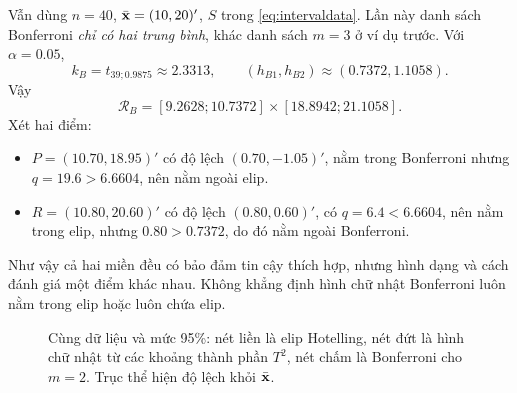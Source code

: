 \begin{example}
Vẫn dùng $n=40$, $\bar{\mathbf x}=(10,20)'$, $S$ trong \eqref{eq:intervaldata}.
Lần này danh sách Bonferroni \emph{chỉ có hai trung bình}, khác danh sách
$m=3$ ở ví dụ trước. Với $\alpha=0.05$,
\[
 k_B=t_{39;0.9875}\approx2.3313,\qquad
 (h_{B1},h_{B2})\approx(0.7372,1.1058).
\]
Vậy
\[
 \mathcal R_B=[9.2628;10.7372]\times[18.8942;21.1058].
\]
Xét hai điểm:
\begin{itemize}
 \item $P=(10.70,18.95)'$ có độ lệch $(0.70,-1.05)'$,
 nằm trong Bonferroni nhưng $q=19.6>6.6604$, nên nằm ngoài elip.
 \item $R=(10.80,20.60)'$ có độ lệch $(0.80,0.60)'$,
 có $q=6.4<6.6604$, nên nằm trong elip, nhưng $0.80>0.7372$,
 do đó nằm ngoài Bonferroni.
\end{itemize}
Như vậy cả hai miền đều có bảo đảm tin cậy thích hợp, nhưng hình dạng
và cách đánh giá một điểm khác nhau. Không khẳng định hình chữ nhật
Bonferroni luôn nằm trong elip hoặc luôn chứa elip.
\end{example}

\begin{figure}[htbp]
\centering
{}
\caption{Cùng dữ liệu và mức 95\%: nét liền là elip Hotelling,
 nét đứt là hình chữ nhật từ các khoảng thành phần $T^2$, nét chấm là
 Bonferroni cho $m=2$. Trục thể hiện độ lệch khỏi $\bar{\mathbf x}$.}
\label{fig:three_regions}
\end{figure}

